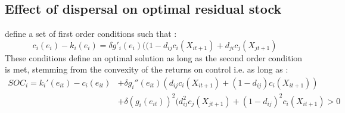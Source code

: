 
%
%
%



\subsection{Effect of dispersal on optimal residual stock}

\cite{costello_private_2017} define a set of first order conditions such that : 
\begin{equation}
c_i(e_i) - k_i(e_i) = \delta g'_i(e_i)((1-d_{ij}c_i(X_{it+1}) + d_{ji}c_j(X_{jt+1})
\end{equation}
These conditions define an optimal solution as long as the second order condition is met, stemming from the convexity of the returns on control i.e. as long as : 
\begin{align*}
SOC_i = k_i'(e_{it}) - c_i(e_{it}) &+ \delta g_i''(e_{it})(d_{ij}c_i(X_{it+1}) + (1-d_{ij})c_i(X_{it+1})) \\ 
&+\delta (g_i(e_{it}))^2 (d_{ij}^2 c_j(X_{jt+1}) + (1- d_{ij})^2 c_i(X_{it+1})>0
\end{align*}

